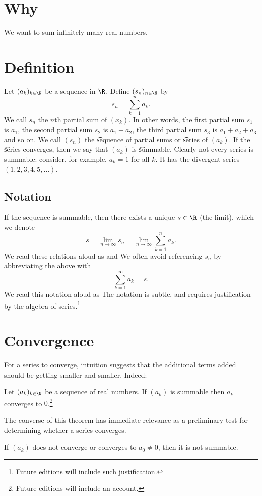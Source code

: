 

\section*{Why}

We want to sum infinitely many real numbers.

\section*{Definition}

Let $(a_k)_{k \in \N  }$ be a sequence in $\R $.
Define $(s_n)_{n \in \N  }$ by
    \[
s_n = \sum_{k = 1}^{n} a_k.
    \]
We call $s_n$ the \t{$n$th partial sum} of $(x_k)$.
In other words, the first partial sum $s_1$ is $a_1$, the second partial sum $s_2$ is $a_1 + a_2$, the third partial sum $s_3$ is $a_1 + a_2 + a_3$ and so on.
We call $(s_n)$ the \t{sequence of partial sums} or \t{series} of $(a_k)$.
If the \t{series} converges, then we say that $(a_k)$ is \t{summable}.
Clearly not every series is summable: consider, for example, $a_k = 1$ for all $k$. It has the divergent series $(1, 2, 3, 4, 5, \dots )$.


\subsection*{Notation}

If the sequence is summable, then there exists a unique $s \in \R $ (the limit), which we denote
    \[
s = \lim_{n\to\infty} s_n = \lim_{n\to\infty} \sum_{k = 1}^{n} a_k.
    \]
We read these relations aloud as  and 
We often avoid referencing $s_n$ by abbreviating the above with
    \[
\sum_{k = 1}^{\infty} a_k = s.
    \]
We read this notation aloud as 
The notation is subtle, and requires justification by the algebra of series.\footnote{Future editions will include such justification.}

\section*{Convergence}

For a series to converge, intuition suggests that the additional terms added should be getting smaller and smaller. Indeed:

\begin{proposition}
Let $(a_k)_{k \in \N  }$ be a sequence of real numbers.
If $(a_k)$ is summable then $a_k$ converges to $0$.\footnote{Future editions will include an account.}\end{proposition}
The converse of this theorem has immediate relevance as a preliminary test for determining whether a series converges.

\begin{proposition}
If $(a_k)$ does not converge or converges to $a_0 \neq 0$, then it is not summable.\end{proposition}